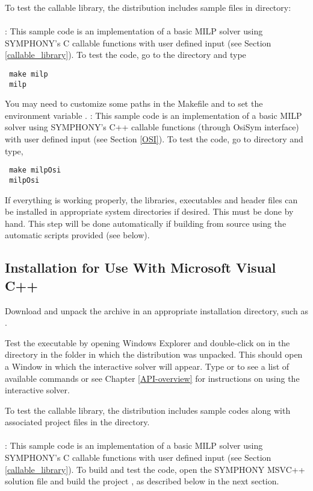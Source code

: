 To test the callable library, the distribution
includes sample files in  directory:  \\ \\
: This sample code is an implementation of a basic MILP
solver using SYMPHONY's C callable functions with user defined input (see
Section \ref{callable_library}). To test the code, go to the
 directory and type 
{\color{Brown}
\begin{verbatim}
 make milp 
 milp
\end{verbatim}
}
You may need to customize some paths in the Makefile and to set the
environment variable . 
: This sample code is an implementation of a basic MILP 
solver using SYMPHONY's C++ callable functions (through OsiSym interface)
with user defined input (see Section \ref{OSI}). To test the code, 
go to  directory and type, 
{\color{Brown}
\begin{verbatim}
 make milpOsi
 milpOsi
\end{verbatim}
}

If everything is working properly, the libraries, executables and header files
can be installed in appropriate system directories if desired. This must be
done by hand. This step will be done automatically if building from source
using the automatic scripts provided (see below).

\subsection{Installation for Use With Microsoft Visual C++}

Download and unpack the archive  in an
appropriate installation directory, such as . 

Test the executable by opening Windows Explorer and double-click
on  in the 
directory in the folder in which the distribution was unpacked. This should
open a Window in which the interactive solver will appear. Type 
or  to see a list of available commands or see Chapter
\ref{API-overview} for instructions on using the interactive solver.

To test the callable library, the distribution includes sample codes
along with associated project files in the  directory. \\ \\
: This sample code is an implementation of a basic MILP
solver using SYMPHONY's C callable functions with user defined input (see
Section \ref{callable_library}). To build and test the code, open the SYMPHONY
MSVC++ solution file and build the project , as
described below in the next section.

